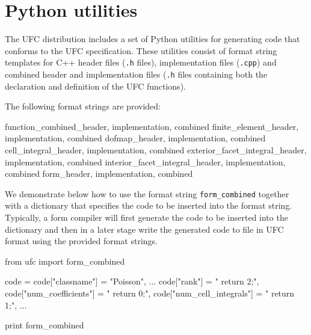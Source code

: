 \chapter{Python utilities}

The UFC distribution includes a set of Python utilities for generating
code that conforms to the UFC specification. These utilities consist
of format string templates for C++ header files (\texttt{.h} files),
implementation files (\texttt{.cpp}) and combined header and
implementation files (\texttt{.h} files containing both the
declaration and definition of the UFC functions).

The following format strings are provided:

\begin{code}
function_combined_{header, implementation, combined}
finite_element_{header, implementation, combined}
dofmap_{header, implementation, combined}
cell_integral_{header, implementation, combined}
exterior_facet_integral_{header, implementation, combined}
interior_facet_integral_{header, implementation, combined}
form_{header, implementation, combined}
\end{code}

We demonstrate below how to use the format string
\texttt{form\_combined} together with a dictionary that specifies the
code to be inserted into the format string. Typically, a form compiler
will first generate the code to be inserted into the dictionary and
then in a later stage write the generated code to file in UFC format
using the provided format strings.

\begin{code}
from ufc import form_combined

code = {}
code["classname"] = "Poisson",
...
code["rank"] = "    return 2;",
code["num_coefficients"] = "    return 0;",
code["num_cell_integrals"] = "    return 1;",
...

print form_combined %
\end{code}
